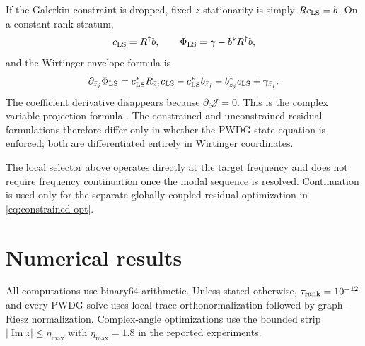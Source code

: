 \documentclass[11pt]{article}
\newcommand{\Jfun}{\mathcal J}
\renewcommand{\Im}{\operatorname{Im}}
\numberwithin{equation}{section}
\begin{document}
If the Galerkin constraint is dropped, fixed-$z$ stationarity is simply $Rc_{\rm LS}=b$.  On a constant-rank stratum,
\begin{equation}\label{eq:varpro}
 c_{\rm LS}=R^\dagger b,
 \qquad
 \Phi_{\rm LS}=\gamma-b^*R^\dagger b,
\end{equation}
and the Wirtinger envelope formula is
\begin{equation}\label{eq:wirtinger-ls-gradient}
 \partial_{\bar z_j}\Phi_{\rm LS}
 =c_{\rm LS}^*R_{\bar z_j}c_{\rm LS}
  -c_{\rm LS}^*b_{\bar z_j}-b_{z_j}^*c_{\rm LS}+\gamma_{\bar z_j}.
\end{equation}
The coefficient derivative disappears because $\partial_{\bar c}\Jfun=0$.  This is the complex variable-projection formula \citep{GolubPereyra1973,GolubPereyra2003}.  The constrained and unconstrained residual formulations therefore differ only in whether the PWDG state equation is enforced; both are differentiated entirely in Wirtinger coordinates.


The local selector above operates directly at the target frequency and does not require frequency continuation once the modal sequence is resolved.  Continuation is used only for the separate globally coupled residual optimization in \eqref{eq:constrained-opt}.

\section{Numerical results}\label{sec:numerics}
All computations use binary64 arithmetic.  Unless stated otherwise, $\tau_{\rm rank}=10^{-12}$ and every PWDG solve uses local trace orthonormalization followed by graph--Riesz normalization.  Complex-angle optimizations use the bounded strip $|\Im z|\le\eta_{\max}$ with $\eta_{\max}=1.8$ in the reported experiments.
\end{document}
